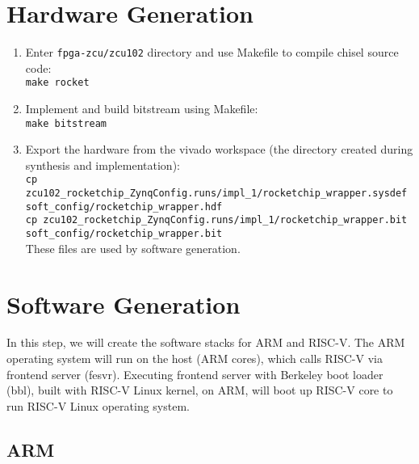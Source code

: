 \documentclass[a4paper,11pt]{article}
\begin{document}
\section{Hardware Generation}
\begin{enumerate}
\item Enter  {\tt fpga-zcu/zcu102} directory and use Makefile to compile chisel source code:\\
{\tt make rocket}
\item Implement and build bitstream using Makefile:\\
 {\tt make bitstream}
 

\item Export the hardware from the vivado workspace (the directory created during synthesis and implementation):\\
{\tt cp zcu102\_rocketchip\_ZynqConfig.runs/impl\_1/rocketchip\_wrapper.sysdef soft\_config/rocketchip\_wrapper.hdf}\\
{\tt cp zcu102\_rocketchip\_ZynqConfig.runs/impl\_1/rocketchip\_wrapper.bit soft\_config/rocketchip\_wrapper.bit}\\
These files are used by software generation.
\end{enumerate}

\section{Software Generation}
In this step, we will create the software stacks for ARM and RISC-V. The ARM operating system will run on the host (ARM cores), which calls RISC-V via frontend server (fesvr). Executing frontend server with Berkeley boot loader (bbl), built with RISC-V Linux kernel, on ARM, will boot up RISC-V core to run RISC-V Linux operating system.  

\subsection{ARM}\label{sec-arm}
\end{document}
